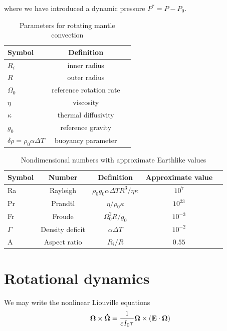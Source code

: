 \documentclass[extra,onecolumn]{gji}
\begin{document}
where we have introduced a dynamic pressure $P^* = P - P_0$.

\begin{table}
\centering
\caption{Parameters for rotating mantle convection}
\label{parameters}
\begin{tabular}{@{}lcc}
Symbol & Definition\\
\hline
$R_i$ & inner radius \\
$R$ & outer radius \\
$\Omega_0$ & reference rotation rate \\
$\eta$ & viscosity \\
$\kappa$ & thermal diffusivity \\
$g_0$ & reference gravity \\
$\delta \rho = \rho_0 \alpha \Delta T$ & buoyancy parameter \\ 
\end{tabular}
\end{table}

\begin{table}
\centering
\caption{Nondimensional numbers with approximate Earthlike values}
\label{nondim}
\begin{tabular}{@{}lcccc}
Symbol &  Number & Definition & Approximate value \\
\hline
Ra & Rayleigh &  $\rho_0 g_0 \alpha \Delta T R^3/\eta \kappa$ & $10^7$\\
Pr & Prandtl & $\eta/\rho_0 \kappa$ & $10^{23}$ \\
Fr & Froude & $\Omega_0^2 R/g_0$ & $10^{-3}$ \\
$\Gamma$ & Density deficit & $\alpha \Delta T$ & $10^{-2}$ \\
A & Aspect ratio & $R_i/R$ & $0.55$ \\
\end{tabular}
\end{table}
 



\section{Rotational dynamics}
\label{sec:rotation}

We may write the nonlinear Liouville equations 
\begin{equation}
{\bf \Omega} \times {\bf \dot{\Omega} } = \frac{1}{\varepsilon I_0 \tau} {\bf \Omega} \times \left( {\bf E \cdot \Omega} \right)
\label{eq:liouville}
\end{equation}
\end{document}
